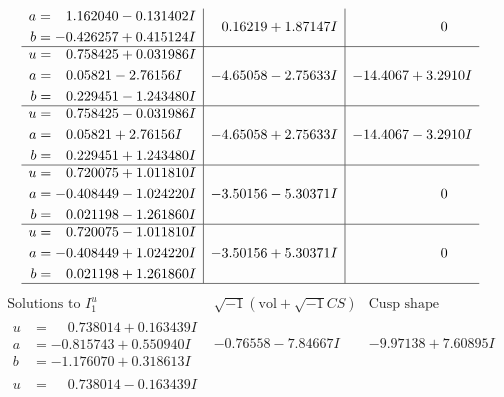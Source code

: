 \documentclass[1p]{elsarticle_modified}
\theoremstyle{definition}
\newcommand{\I}{\sqrt{-1}}
\begin{document}
$$\begin{array}{c|c|c}
\begin{aligned}
a &= \phantom{-}1.162040 - 0.131402 I \\
b &= -0.426257 + 0.415124 I\end{aligned}
 & \phantom{-}0.16219 + 1.87147 I & \phantom{-0.000000 } 0 \\ \hline\begin{aligned}
u &= \phantom{-}0.758425 + 0.031986 I \\
a &= \phantom{-}0.05821 - 2.76156 I \\
b &= \phantom{-}0.229451 - 1.243480 I\end{aligned}
 & -4.65058 - 2.75633 I & -14.4067 + 3.2910 I \\ \hline\begin{aligned}
u &= \phantom{-}0.758425 - 0.031986 I \\
a &= \phantom{-}0.05821 + 2.76156 I \\
b &= \phantom{-}0.229451 + 1.243480 I\end{aligned}
 & -4.65058 + 2.75633 I & -14.4067 - 3.2910 I \\ \hline\begin{aligned}
u &= \phantom{-}0.720075 + 1.011810 I \\
a &= -0.408449 - 1.024220 I \\
b &= \phantom{-}0.021198 - 1.261860 I\end{aligned}
 & -3.50156 - 5.30371 I & \phantom{-0.000000 } 0 \\ \hline\begin{aligned}
u &= \phantom{-}0.720075 - 1.011810 I \\
a &= -0.408449 + 1.024220 I \\
b &= \phantom{-}0.021198 + 1.261860 I\end{aligned}
 & -3.50156 + 5.30371 I & \phantom{-0.000000 } 0\\
 \hline 
 \end{array}$$\newpage$$\begin{array}{c|c|c}  
\text{Solutions to }I^u_{1}& \I (\text{vol} + \sqrt{-1}CS) & \text{Cusp shape}\\
 \hline 
\begin{aligned}
u &= \phantom{-}0.738014 + 0.163439 I \\
a &= -0.815743 + 0.550940 I \\
b &= -1.176070 + 0.318613 I\end{aligned}
 & -0.76558 - 7.84667 I & -9.97138 + 7.60895 I \\ \hline\begin{aligned}
u &= \phantom{-}0.738014 - 0.163439 I \\

\end{aligned}
\end{array}$$
\end{document}
